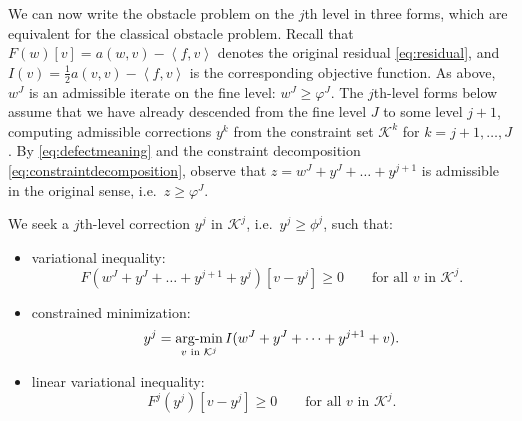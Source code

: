 \documentclass[letterpaper,final,12pt,reqno]{amsart}
\theoremstyle{claim}
\newcommand{\ip}[2]{\left<#1,#2\right>}
\numberwithin{equation}{section}
\numberwithin{figure}{section}
\numberwithin{table}{section}
\numberwithin{theorem}{section}
\begin{document}
We can now write the obstacle problem on the $j$th level in three forms, which are equivalent for the classical obstacle problem.  Recall that $F(w)[v] = a(w,v) - \ip{f}{v}$ denotes the original residual \eqref{eq:residual}, and $I(v) = \frac{1}{2} a(v,v) - \ip{f}{v}$ is the corresponding objective function.  As above, $w^J$ is an admissible iterate on the fine level: $w^J\ge \varphi^J$.  The $j$th-level forms below assume that we have already descended from the fine level $J$ to some level $j+1$, computing admissible corrections $y^k$ from the constraint set $\mathcal{K}^k$ for $k=j+1,\dots,J$.  By  \eqref{eq:defectmeaning} and the constraint decomposition \eqref{eq:constraintdecomposition}, observe that $z = w^J+y^J+\dots+y^{j+1}$ is admissible in the original sense, i.e.~$z\ge \varphi^J$.

We seek a $j$th-level correction $y^j$ in $\mathcal{K}^j$, i.e.~$y^j\ge \phi^j$, such that:
\begin{itemize}
\item variational inequality:
\begin{equation}
  F(w^J+y^J+\dots+y^{j+1}+y^j)[v - y^j] \ge 0 \qquad \text{for all } v \text{ in } \mathcal{K}^j.  \label{eq:mcdvi}
\end{equation}
\item constrained minimization:
\begin{equation}
  y^j = \mathop{\mathrm{arg\text{-}min}}_{v \text{ in } \mathcal{K}^j} I(w^J+y^J+\dots+y^{j+1}+v).  \label{eq:mcdminimization}
\end{equation}
\item linear variational inequality:
\begin{equation}
  F^j(y^j)[v - y^j] \ge 0 \qquad \text{for all } v \text{ in } \mathcal{K}^j.   \label{eq:mcdvilinear}
\end{equation}
\end{itemize}
\end{document}
